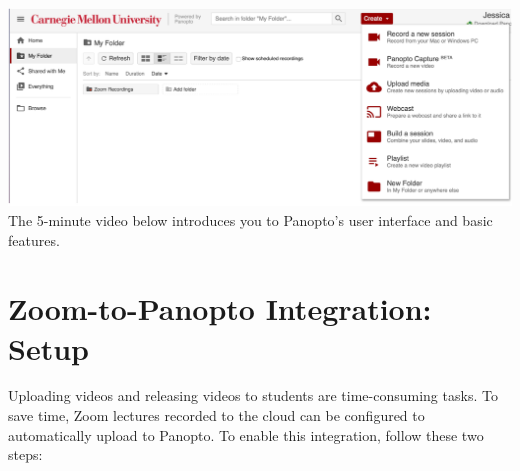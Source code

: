 \begin{gram}

{
\centering
\includegraphics[scale=0.4]{panopto/media/01-ui.png}
}
The 5-minute video below introduces you to Panopto’s user interface and basic features.

\end{gram}


\section{Zoom-to-Panopto Integration: Setup}
\label{sec:panopto:zoom_to_panopto_integration_set_up}

Uploading videos and releasing videos to students are time-consuming tasks. To save time, Zoom lectures recorded to the cloud can be configured to automatically upload to Panopto. To enable this integration, follow these two steps:

